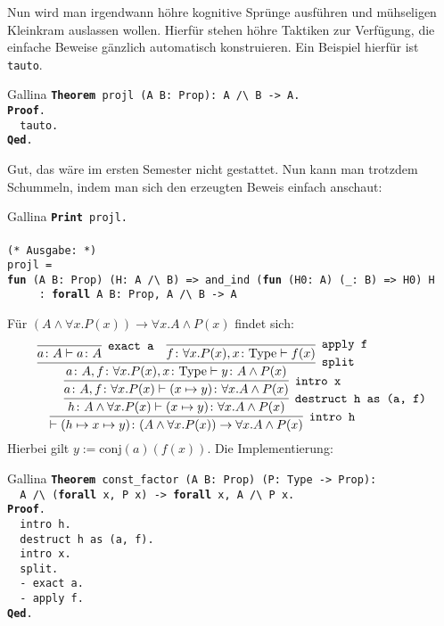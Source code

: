 \documentclass[8pt]{beamer}
\newcommand{\kw}[1]{\textbf{#1}}
\begin{document}
\begin{frame}
Nun wird man irgendwann höhre kognitive Sprünge ausführen und
mühseligen Kleinkram auslassen wollen. Hierfür stehen höhre Taktiken
zur Verfügung, die einfache Beweise gänzlich automatisch konstruieren.
Ein Beispiel hierfür ist \texttt{tauto}.\pause
\begin{block}{Gallina}
\texttt{\kw{Theorem} projl (A B: Prop): A /{\textbackslash} B -> A.\\
\kw{Proof}.\\
\ \ tauto.\\
\kw{Qed}.}
\end{block}\pause
Gut, das wäre im ersten Semester nicht gestattet. Nun kann man trotzdem
Schummeln, indem man sich den erzeugten Beweis einfach anschaut:
\begin{block}{Gallina}
\texttt{\kw{Print} projl.\\
\mbox{}\\
(* Ausgabe: *)\\
projl = \\
\kw{fun} (A B: Prop) (H: A /{\textbackslash} B) => and\_ind (\kw{fun} (H0: A) (\_: B) => H0) H\\
\ \ \ \ \ : \kw{forall} A B: Prop, A /{\textbackslash} B -> A}
\end{block}
\end{frame}

\begin{frame}
Für $(A\land\forall x. P(x))\to\forall x. A\land P(x)$ findet sich:\pause
\[
\infer[\texttt{intro h}]{\vdash (h\mapsto x\mapsto y)\colon (A\land\forall x. P(x))\to\forall x. A\land P(x)}{
  \infer[\texttt{destruct h as (a, f)}]{h\colon A\land\forall x. P(x)\vdash (x\mapsto y)\colon\forall x.A\land P(x)}{
    \infer[\texttt{intro x}]{a\colon A, f\colon \forall x.P(x)\vdash (x\mapsto y)\colon\forall x.A\land P(x)}{
      \infer[\texttt{split}]{a\colon A, f\colon \forall x.P(x), x\colon\mathrm{Type}\vdash y\colon A\land P(x)}{
        \infer[\texttt{exact a}]{a\colon A\vdash a\colon A}{}
      & \infer[\texttt{apply f}]{f\colon\forall x.P(x), x\colon\mathrm{Type}\vdash f(x)}{}}}}}
\]
Hierbei gilt $y:=\mathrm{conj}(a)(f(x))$. Die Implementierung:\pause

\begin{block}{Gallina}
\texttt{\kw{Theorem} const\_factor (A B: Prop) (P: Type -> Prop):\\
\ \ A /{\textbackslash} (\kw{forall} x, P x) -> \kw{forall} x, A /{\textbackslash} P x.\\
\kw{Proof}.\\
\ \ intro h.\\
\ \ destruct h as (a, f).\\
\ \ intro x.\\
\ \ split.\\
\ \ - exact a.\\
\ \ - apply f.\\
\kw{Qed}.}
\end{block}
\end{frame}
\end{document}
